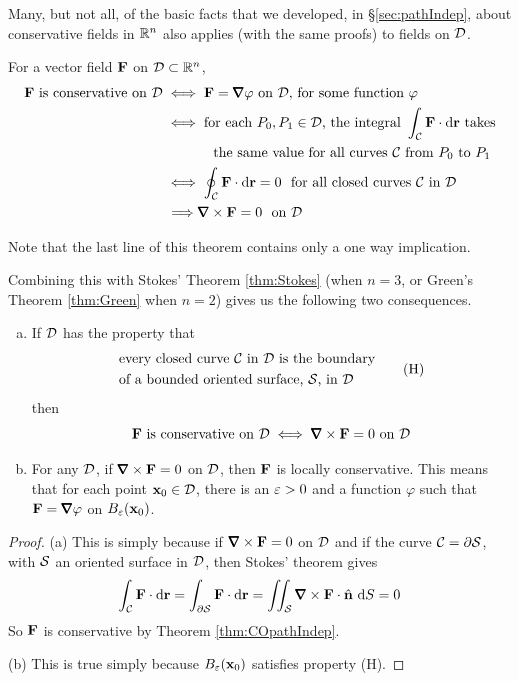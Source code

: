Many, but not all, of the basic facts that we developed, in \S\ref{sec:pathIndep}, 
about conservative fields in $\mathbb{R}^n$ also applies (with the same proofs) 
to fields on $\mathcal{D}$. 

\begin{theorem}\label{thm:COpathIndep}
For a vector field $\mathbf{F}$ 
on $\mathcal{D}\subset\mathbb{R}^n$,
\begin{align*}
\vF\text{ is conservative on $\cD$}
&\iff \vF=\vnabla \varphi\text{ on $\cD$, for some function $\varphi$} \\
&\iff \text{for each $P_0,P_1\in\cD$, the integral }\int_\cC \vF\cdot \dee{\vr} 
            \text{ takes}\\
&\hskip 0.5in \text{the same value for all curves $\cC$ from $P_0$ to $P_1$} \\
&\iff \oint_\cC \vF\cdot \dee{\vr}=0\ \text{ for all closed curves $\cC$ in $\cD$}\\
&\ \Longrightarrow \vnabla\times \vF=0\ \text{ on $\cD$}
\end{align*}
\end{theorem}
\noindent Note that the last line of this theorem contains only a one way implication.

Combining this with Stokes' Theorem \ref{thm:Stokes} 
(when $n=3$, or Green's Theorem \ref{thm:Green} when $n=2$) gives us the following two consequences.
\begin{theorem}\label{thm:closedExact}
\begin{enumerate}[(a)]
\item
If $\mathcal{D}$ has the property that 
\begin{equation}
\begin{split}
&\text{every closed curve $\mathcal{C}$ in $\mathcal{D}$ is the boundary} \\
&\text{of a bounded oriented surface, $\mathcal{S}$, in $\mathcal{D}$}
\end{split}
\tag{H}\end{equation}
then 
\begin{equation*}
\vF\text{ is conservative on $\cD$}
\iff \vnabla\times \vF=0\text{ on $\cD$}
\end{equation*}

\item 
For any $\mathcal{D}$, if $\vnabla\times \vF=0$ on $\mathcal{D}$,
then $\mathbf{F}$ is locally conservative. This means that for each point
$\mathbf{x}_0\in\mathcal{D}$, there is an $\varepsilon>0$ and a function $\varphi$ such that
$\vF=\vnabla\varphi$ on $B_\varepsilon(\mathbf{x}_0)$. 
\end{enumerate}
\end{theorem}
\begin{proof} (a) 
This is simply because if $\vnabla\times\vF=0$ on $\mathcal{D}$ and if 
the curve $\mathcal{C}=\partial\mathcal{S}$,
with $\mathcal{S}$ an oriented surface in $\mathcal{D}$, then Stokes' theorem gives
\begin{equation*}
\int_\cC \vF\cdot \dee{\vr}
=\int_{\partial\cS} \vF\cdot \dee{\vr}
=\dblInt_\cS \vnabla\times \vF\cdot\hn\ \dee{S}=0
\end{equation*}
So $\mathbf{F}$ is conservative by Theorem \ref{thm:COpathIndep}.


\noindent (b)
This is true simply because
$B_\varepsilon(\mathbf{x}_0)$ satisfies property (H).
\end{proof}

